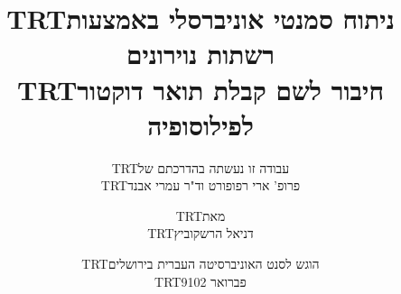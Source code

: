 \documentclass[12pt,a4paper,table]{report}
\newcommand{\heb}[1]{\bgroup\textdir TRT\hebfont #1\egroup}
\begin{document}
\pagebreak

\clearpage

\title{}
\author{
\heb{עבודה זו נעשתה בהדרכתם של} \\
\heb{פרופ' ארי רפופורט וד"ר עמרי אבנד}}
\date{}

\maketitle
\clearpage

\title{
\textbf{\heb{ניתוח סמנטי אוניברסלי באמצעות רשתות נוירונים}} \\
\vspace{2cm}
{\large\heb{חיבור לשם קבלת תואר דוקטור לפילוסופיה}}
}
\author{
\heb{מאת}\\
\heb{דניאל הרשקוביץ}
\vspace{2cm}
}
\date{
\heb{הוגש לסנט האוניברסיטה העברית בירושלים} \\
\heb{פברואר 9102}
}

\maketitle
\maketitle
\end{document}
